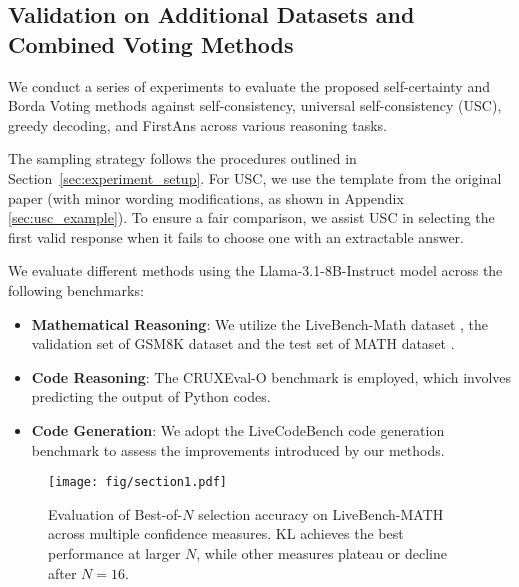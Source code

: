 \subsection{Validation on Additional Datasets and Combined Voting Methods} \label{sec:borda_setup}
We conduct a series of experiments to evaluate the proposed self-certainty and Borda Voting methods against self-consistency, universal self-consistency (USC), greedy decoding, and FirstAns across various reasoning tasks.


The sampling strategy follows the procedures outlined in Section~\ref{sec:experiment_setup}. For USC, we use the template from the original paper \cite{chen2023universal} (with minor wording modifications, as shown in Appendix \ref{sec:usc_example}). To ensure a fair comparison, we assist USC in selecting the first valid response when it fails to choose one with an extractable answer. 

We evaluate different methods using the Llama-3.1-8B-Instruct model across the following benchmarks:
\begin{itemize}[leftmargin=*, itemsep=0pt, topsep=0pt]
    \item \textbf{Mathematical Reasoning}: We utilize the LiveBench-Math dataset \cite{white2024livebench}, the validation set of GSM8K dataset \cite{gsm} and the test set of MATH dataset \cite{MATH}.
    \item \textbf{Code Reasoning}: The CRUXEval-O benchmark \cite{gu2024cruxeval} is employed, which involves predicting the output of Python codes.
    \item \textbf{Code Generation}: We adopt the LiveCodeBench code generation benchmark \cite{jain2024livecodebench} to assess the improvements introduced by our methods.
\end{itemize}

\begin{figure}[t]
    \centering
    \texttt{[image: fig/section1.pdf]}
    \caption{Evaluation of Best-of-\(N\) selection accuracy on LiveBench-MATH across multiple confidence measures. KL achieves the best performance at larger \(N\), while other measures plateau or decline after \(N = 16\).} 
    \label{fig:expression_selection}
\end{figure}

